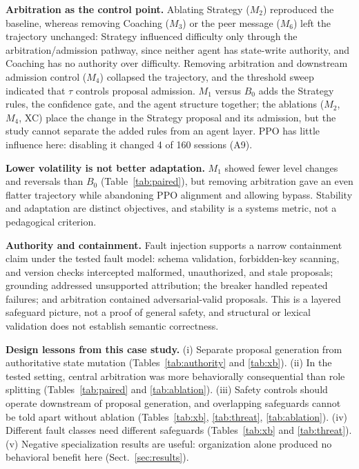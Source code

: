 \documentclass[runningheads,a4paper]{llncs}
\begin{document}
\textbf{Arbitration as the control point.} Ablating Strategy ($M_2$) reproduced the baseline, whereas removing Coaching ($M_3$) or the peer message ($M_6$) left the trajectory unchanged: Strategy influenced difficulty only through the arbitration/admission pathway, since neither agent has state-write authority, and Coaching has no authority over difficulty. Removing arbitration and downstream admission control ($M_4$) collapsed the trajectory, and the threshold sweep indicated that $\tau$ controls proposal admission. $M_1$ versus $B_0$ adds the Strategy rules, the confidence gate, and the agent structure together; the ablations ($M_2$, $M_4$, XC) place the change in the Strategy proposal and its admission, but the study cannot separate the added rules from an agent layer. PPO has little influence here: disabling it changed 4 of 160 sessions (A9).

\textbf{Lower volatility is not better adaptation.} $M_1$ showed fewer level changes and reversals than $B_0$ (Table~\ref{tab:paired}), but removing arbitration gave an even flatter trajectory while abandoning PPO alignment and allowing bypass. Stability and adaptation are distinct objectives, and stability is a systems metric, not a pedagogical criterion.

\textbf{Authority and containment.} Fault injection supports a narrow containment claim under the tested fault model: schema validation, forbidden-key scanning, and version checks intercepted malformed, unauthorized, and stale proposals; grounding addressed unsupported attribution; the breaker handled repeated failures; and arbitration contained adversarial-valid proposals. This is a layered safeguard picture, not a proof of general safety, and structural or lexical validation does not establish semantic correctness.

\textbf{Design lessons from this case study.} (i) Separate proposal generation from authoritative state mutation (Tables~\ref{tab:authority} and \ref{tab:xb}). (ii) In the tested setting, central arbitration was more behaviorally consequential than role splitting (Tables~\ref{tab:paired} and \ref{tab:ablation}). (iii) Safety controls should operate downstream of proposal generation, and overlapping safeguards cannot be told apart without ablation (Tables~\ref{tab:xb}, \ref{tab:threat}, \ref{tab:ablation}). (iv) Different fault classes need different safeguards (Tables~\ref{tab:xb} and \ref{tab:threat}). (v) Negative specialization results are useful: organization alone produced no behavioral benefit here (Sect.~\ref{sec:results}). 
\end{document}
